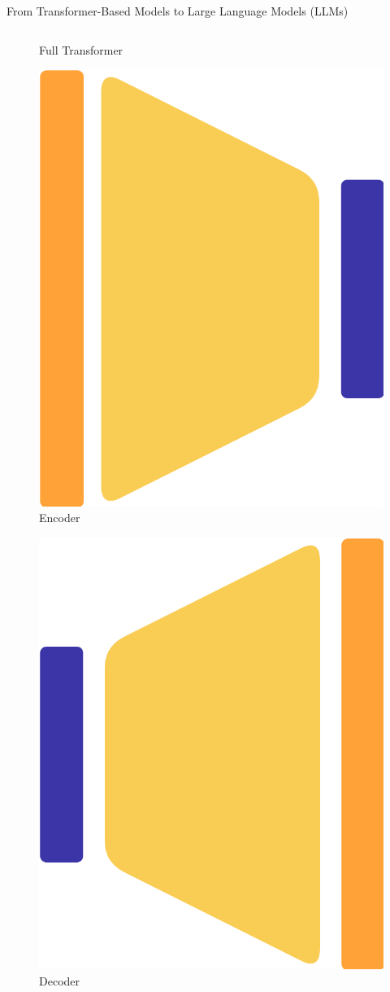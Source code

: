 \documentclass[11pt,aspectratio=169]{beamer}
\begin{document}
\begin{frame}{From Transformer-Based Models to Large Language Models (LLMs)}
\begin{columns}
\begin{column}{0.3\linewidth}
\begin{figure}
            \caption{\centering\footnotesize Full Transformer}
        \end{figure}
        \vspace{-0.6cm}
        \begin{figure}
            \includegraphics[width=0.24\linewidth]{ed_encoder_only.png}
            \caption{\centering\footnotesize Encoder}
        \end{figure}
        \vspace{-0.6cm}
        \begin{figure}
            \includegraphics[width=0.24\linewidth]{ed_decoder_only.png}
            \caption{\centering\footnotesize Decoder}
        \end{figure}
    \end{column}
\end{columns}
\end{frame}
\end{document}
